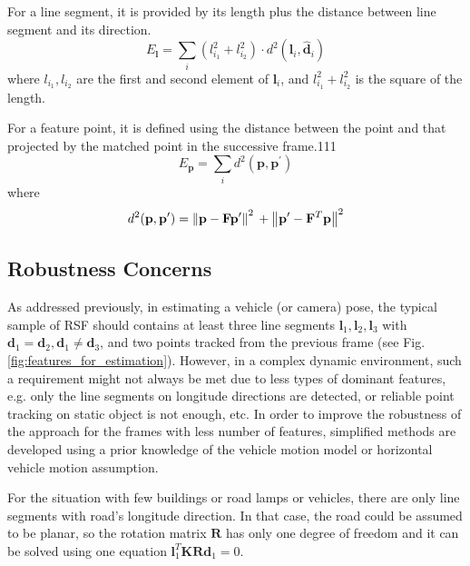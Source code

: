 \documentclass[letterpaper, 10 pt, conference]{ieeeconf}  %
\begin{document}
For a line segment, it is provided by its length plus the distance between line segment and its direction.
\begin{equation}
E_\mathbf{l} = \sum_{i} \left(l_{i_1}^2+l_{i_2}^2\right) \cdot d^2(\mathbf{l}_i,\hat{\mathbf{d}}_i)
\end{equation}
where $l_{i_1},l_{i_2}$ are the first and second element of $\mathbf{l}_i$, and $l_{i_1}^2+l_{i_2}^2$ is the square of the length.

For a feature point, it is defined using the distance between the point and that projected by the matched point in the successive frame.111
\begin{equation}
E_\mathbf{p} = \sum_{i} d^2(\mathbf{p}, \mathbf{p}^\prime)
\end{equation}
where
\begin{equation}
d^2(\mathbf{p}, \mathbf{p}^\prime)
= \left\| \mathbf{p} - \mathbf{F} \mathbf{p}^\prime \right\|^2 \\
+ \left\| \mathbf{p}^\prime - \mathbf{F}^T\mathbf{p} \right\|^2
\end{equation}

\subsection{Robustness Concerns}
As addressed previously, in estimating a vehicle (or camera) pose, the typical sample of RSF should contains at least three line segments $\mathbf{l}_1,\mathbf{l}_2,\mathbf{l}_3$ with $\mathbf{d}_1=\mathbf{d}_2,\mathbf{d}_1\neq \mathbf{d}_3$, and two points tracked from the previous frame (see Fig. \ref{fig:features_for_estimation}).
However, in a complex dynamic environment, such a requirement might not always be met due to less types of dominant features, e.g. only the line segments on longitude directions are detected, or reliable point tracking on static object is not enough, etc. In order to improve the robustness of the approach for the frames with less number of features, simplified methods are developed using a prior knowledge of the vehicle motion model or horizontal vehicle motion assumption.

For the situation with few buildings or road lamps or vehicles, there are only line segments with road's longitude direction. In that case, the road could be assumed to be planar, so the rotation matrix $\mathbf{R}$ has only one degree of freedom and it can be solved using one equation $\mathbf{l}_1^T\mathbf{K}\mathbf{R}\mathbf{d}_1=0$.
\end{document}
